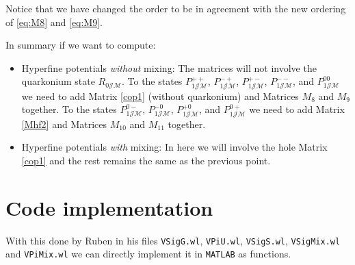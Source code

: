 \documentclass[11pt, a4paper]{article}
\begin{document}
Notice that we have changed the order to be in agreement with the new ordering of \eqref{eq:M8} and \eqref{eq:M9}.


In summary if we want to compute:
\begin{itemize}
    \item Hyperfine potentials \textit{without} mixing: The matrices will not involve the quarkonium state $R_{0\mathcal{JM}}$. To the states $P_{1\mathcal{JM}}^{++}$, $P_{1\mathcal{JM}}^{-+}$, $P_{1\mathcal{JM}}^{+-}$, $P_{1\mathcal{JM}}^{--}$, and $P_{1\mathcal{JM}}^{00}$ we need to add Matrix \eqref{cop1} (without quarkonium) and Matrices $M_8$ and $M_9$ together. To the states $P_{1\mathcal{JM}}^{0-}$, $P_{1\mathcal{JM}}^{-0}$, $P_{1\mathcal{JM}}^{+0}$, and $P_{1\mathcal{JM}}^{0+}$ we need to add Matrix \eqref{Mhf2} and Matrices $M_{10}$ and $M_{11}$ together.
    \item Hyperfine potentials \textit{with} mixing: In here we will involve the hole Matrix \eqref{cop1} and the rest remains the same as the previous point.
\end{itemize}






\section{Code implementation}
With this done by Ruben in his files \texttt{VSigG.wl}, \texttt{VPiU.wl}, \texttt{VSigS.wl}, \texttt{VSigMix.wl} and \texttt{VPiMix.wl} we can directly implement it in \texttt{MATLAB} as functions.
\end{document}
